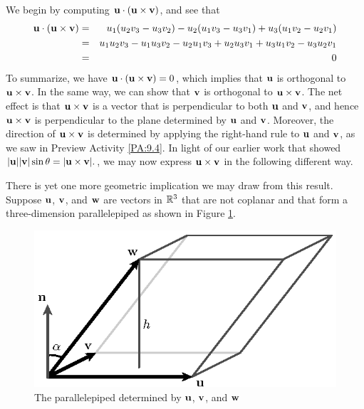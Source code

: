 We begin by computing $\mathbf{u}\cdot(\mathbf{u}\times\mathbf{v})$, and see that
\begin{eqnarray*}
  \mathbf{u}\cdot(\mathbf{u}\times\mathbf{v})&=&u_1(u_2v_3-u_3v_2) - u_2(u_1v_3-u_3v_1) +
  u_3(u_1v_2-u_2v_1) \\
  &=&u_1u_2v_3 - u_1u_3v_2 - u_2u_1v_3+u_2u_3v_1 + u_3u_1v_2 -
  u_3u_2v_1 \\
  &=&0
\end{eqnarray*}
To summarize, we have $\mathbf{u}\cdot(\mathbf{u}\times\mathbf{v}) = 0$, which implies that
$\mathbf{u}$ is orthogonal to $\mathbf{u}\times\mathbf{v}$.  In the same way, we can show that
$\mathbf{v}$ is orthogonal to $\mathbf{u}\times\mathbf{v}$.  The net effect is that
$\mathbf{u}\times\mathbf{v}$ is a vector that is perpendicular to both $\mathbf{u}$ and $\mathbf{v}$, and
hence $\mathbf{u}\times\mathbf{v}$ is perpendicular to the plane determined
by $\mathbf{u}$ and $\mathbf{v}$.  Moreover, the direction of $\mathbf{u}\times\mathbf{v}$ is
determined by applying the right-hand rule to $\mathbf{u}$ and $\mathbf{v}$, as we
saw in Preview Activity \ref{PA:9.4}.  In light of our earlier work that showed 
$
|\mathbf{u}||\mathbf{v}|\sin\theta = |\mathbf{u}\times\mathbf{v}|.
$, we may now express $\mathbf{u} \times \mathbf{v}$ in the following different way.

\vspace*{5pt}
\nin {} \vspace*{5pt}

There is yet one more geometric implication we may draw from this
result.  Suppose $\mathbf{u}$, $\mathbf{v}$, and $\mathbf{w}$ are vectors in $\mathbb{R}^3$ that
are not coplanar and that form a three-dimension parallelepiped as
shown in Figure
\ref{F:9.4.volume}.

\begin{figure}[h]
  \begin{center}
    \includegraphics{figures/fig_9_4_volume.eps}
    \caption{The parallelepiped determined by $\mathbf{u}$, $\mathbf{v}$, and $\mathbf{w}$}
    \label{F:9.4.volume}
  \end{center}
\end{figure}

